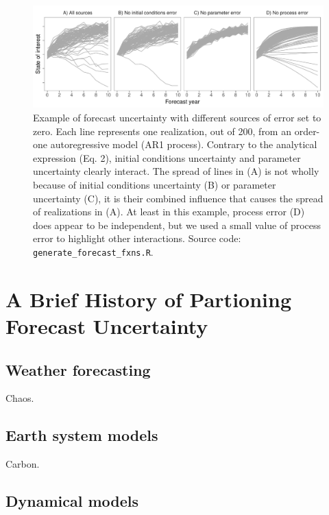 \documentclass[12pt,]{article}
\begin{document}
\begin{figure}
\centering
\includegraphics{../figures/forecast_uncertainty_example.pdf}
\caption{Example of forecast uncertainty with different sources of error
set to zero. Each line represents one realization, out of 200, from an
order-one autoregressive model (AR1 process). Contrary to the analytical
expression (Eq. 2), initial conditions uncertainty and parameter
uncertainty clearly interact. The spread of lines in (A) is not wholly
because of initial conditions uncertainty (B) or parameter uncertainty
(C), it is their combined influence that causes the spread of
realizations in (A). At least in this example, process error (D) does
appear to be independent, but we used a small value of process error to
highlight other interactions. Source code:
\texttt{generate\_forecast\_fxns.R}.}
\end{figure}

\hypertarget{a-brief-history-of-partioning-forecast-uncertainty}{%
\section{A Brief History of Partioning Forecast
Uncertainty}\label{a-brief-history-of-partioning-forecast-uncertainty}}

\hypertarget{weather-forecasting}{%
\subsection{Weather forecasting}\label{weather-forecasting}}

Chaos.

\hypertarget{earth-system-models}{%
\subsection{Earth system models}\label{earth-system-models}}

Carbon.

\hypertarget{dynamical-models}{%
\subsection{Dynamical models}\label{dynamical-models}}
\end{document}
